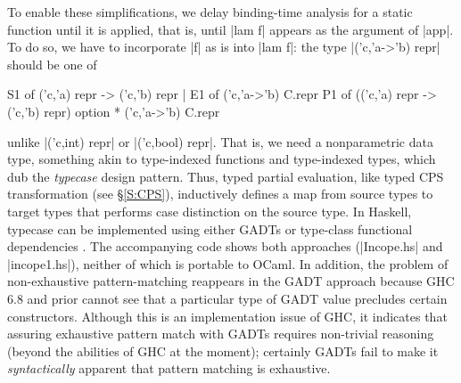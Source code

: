 To enable these simplifications, we delay binding-time analysis
for a static function until it is applied, that is, until |lam f|
appears as the argument of |app|.  To do so, we have to incorporate |f|
as is into |lam f|: the type |('c,'a->'b) repr| should be one of
\begin{code}
S1 of ('c,'a) repr -> ('c,'b) repr | E1 of ('c,'a->'b) C.repr
P1 of (('c,'a) repr -> ('c,'b) repr) option * ('c,'a->'b) C.repr
\end{code}
unlike |('c,int) repr| or |('c,bool) repr|.
That is, we need a nonparametric data type, something akin to
type-indexed functions and type-indexed types, which
\citet{oliveira-typecase} dub the \emph{typecase} design pattern.
Thus, typed partial evaluation, like typed CPS transformation
(see \S\ref{S:CPS}),
inductively defines a map from source types to target types that
performs case distinction on the source type. In Haskell, typecase
can be implemented using either GADTs or
type-class functional dependencies
\citep{oliveira-typecase}. The accompanying code shows both
approaches (|Incope.hs| and |incope1.hs|), 
neither of which is portable to OCaml. In addition,
the problem of non\hyp exhaustive pattern\hyp matching reappears in
the GADT approach because GHC 6.8 and prior cannot see that a particular
type of GADT value precludes certain constructors. Although this
is an implementation issue of GHC,
it indicates that assuring exhaustive pattern match with GADTs
requires non-trivial reasoning (beyond the abilities of GHC at the moment);
certainly GADTs fail to
make it \emph{syntactically} apparent that pattern matching is exhaustive.



